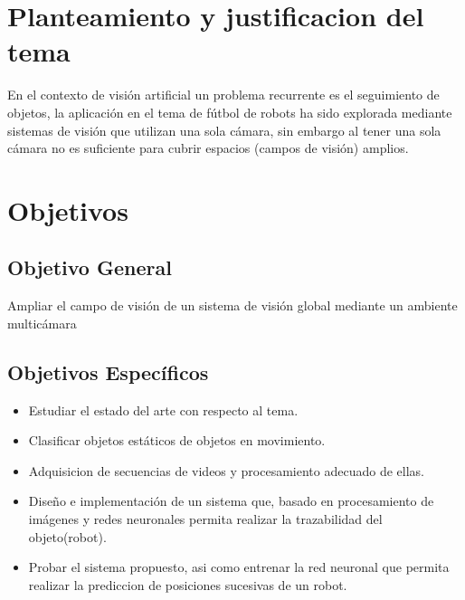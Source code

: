 \documentclass[conference]{IEEEtran}
\begin{document}

 
\section{Planteamiento y justificacion del tema}
En el contexto de visi\'on artificial un problema recurrente es el seguimiento de objetos, la aplicaci\'on en el tema de f\'utbol de robots ha sido explorada mediante sistemas de visi\'on que utilizan una sola c\'amara, sin embargo al tener una sola c\'amara no es suficiente para cubrir espacios (campos de visi\'on) amplios.
\section{Objetivos}
\subsection{Objetivo General}
Ampliar el campo de visi\'on de un sistema de visi\'on global mediante un ambiente multic\'amara
\subsection{Objetivos Espec\'ificos}
\begin{itemize}
\item Estudiar el estado del arte con respecto al tema.
\item Clasificar objetos est\'aticos de objetos en movimiento.
\item Adquisicion de secuencias de videos y procesamiento adecuado de ellas.
\item Dise\~no e implementaci\'on de un sistema que, basado en procesamiento de im\'agenes y redes neuronales permita realizar la trazabilidad del objeto(robot).
\item Probar el sistema propuesto, asi como entrenar la red neuronal  que permita realizar la prediccion de posiciones sucesivas de un robot.

\end{itemize}
\end{document}
